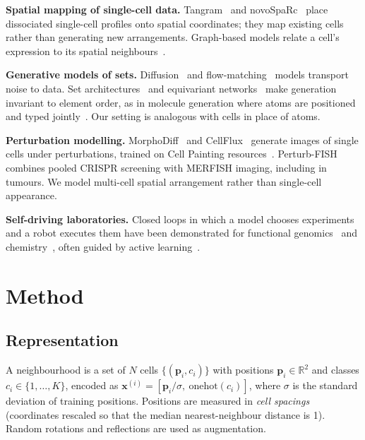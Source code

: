 \documentclass[journal]{IEEEtran}
\begin{document}
\textbf{Spatial mapping of single-cell data.} Tangram~\cite{biancalani2021} and novoSpaRc~\cite{nitzan2019} place dissociated single-cell profiles onto spatial coordinates; they map existing cells rather than generating new arrangements. Graph-based models relate a cell's expression to its spatial neighbours~\cite{fischer2023}.

\textbf{Generative models of sets.} Diffusion~\cite{ho2020} and flow-matching~\cite{lipman2023,liu2023,albergo2023,tong2024} models transport noise to data. Set architectures~\cite{zaheer2017,lee2019} and equivariant networks~\cite{satorras2021,hoogeboom2022} make generation invariant to element order, as in molecule generation where atoms are positioned and typed jointly~\cite{hoogeboom2022}. Our setting is analogous with cells in place of atoms.

\textbf{Perturbation modelling.} MorphoDiff~\cite{navidi2025} and CellFlux~\cite{zhang2025} generate images of single cells under perturbations, trained on Cell Painting resources~\cite{bray2016,chandrasekaran2023}. Perturb-FISH~\cite{binan2025} combines pooled CRISPR screening with MERFISH imaging, including in tumours. We model multi-cell spatial arrangement rather than single-cell appearance.

\textbf{Self-driving laboratories.} Closed loops in which a model chooses experiments and a robot executes them have been demonstrated for functional genomics~\cite{king2004} and chemistry~\cite{burger2020}, often guided by active learning~\cite{settles2009}.

\section{Method}

\subsection{Representation}
A neighbourhood is a set of $N$ cells $\{(\mathbf{p}_i, c_i)\}$ with positions $\mathbf{p}_i\in\mathbb{R}^2$ and classes $c_i\in\{1,\dots,K\}$, encoded as $\mathbf{x}^{(i)} = [\mathbf{p}_i/\sigma,\ \mathrm{onehot}(c_i)]$, where $\sigma$ is the standard deviation of training positions. Positions are measured in \emph{cell spacings} (coordinates rescaled so that the median nearest-neighbour distance is 1). Random rotations and reflections are used as augmentation.
\end{document}
